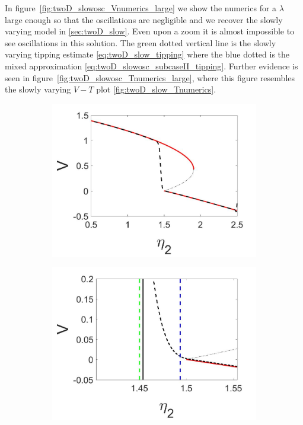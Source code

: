 \indent In figure~\ref{fig:twoD_slowosc_Vnumerics_large} we show the numerics for a $\lambda$ large enough so that the oscillations are negligible and we recover the slowly varying model in \autoref{sec:twoD_slow}. Even upon a zoom it is almost impossible to see oscillations in this solution. The green dotted vertical line is the slowly varying tipping estimate \eqref{eq:twoD_slow_tipping} where the blue dotted is the mixed approximation \eqref{eq:twoD_slowosc_subcaseII_tipping}. Further evidence is seen in figure~\ref{fig:twoD_slowosc_Tnumerics_large}, where this figure resembles the slowly varying $V-T$ plot \eqref{fig:twoD_slow_Tnumerics}.

\begin{figure}[H]
\centering
\begin{subfigure}{.5\textwidth}
 \centering
 \includegraphics[width=\linewidth]{twoD/slowosc_bif_diagram_large.jpg}
 \caption{}
\end{subfigure}%
\begin{subfigure}{.5\textwidth}
 \centering
 \includegraphics[width=\linewidth]{twoD/slowosc_bif_diagram_large_zoom.jpg}

\end{subfigure}
\end{figure}
